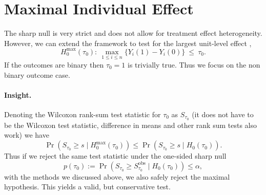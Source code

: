 \documentclass[11pt]{exam}
\theoremstyle{plain}
\begin{document}



\section{Maximal Individual Effect}
The sharp null is very strict and does not allow for treatment effect heterogeneity. However, we can extend the framework to test for the largest unit-level effect \citep{caughey2023randomisation},
\[
H^{\max}_0(\tau_0):\ \max_{1\le i\le n}\{Y_i(1)-Y_i(0)\}\ \le\ \tau_0.
\]
If the outcomes are binary then $\tau_0 = 1$ is trivially true. Thus we focus on the non binary outcome case.

\paragraph{Insight.}
Denoting the Wilcoxon rank-sum test statistic for $\tau_0$ as $S_{\tau_0}$ (it does not have to be the Wilcoxon test statistic, difference in means and other rank sum tests also work) we have
\[
    \Pr(S_{\tau_0} \geq s \mid H^{\max}_0(\tau_0)) \leq \Pr(S_{\tau_0} \geq s \mid H_0(\tau_0)).
\]
Thus if we reject the same test statistic under the one-sided sharp null 
\[
p(\tau_0):= \Pr(S_{\tau_0} \geq S_{\tau_0}^{\text{obs}} \mid H_0(\tau_0)) \leq \alpha,
\]
with the methods we discussed above, we also safely reject the maximal hypothesis. This yields a valid, but conservative test.
\end{document}
